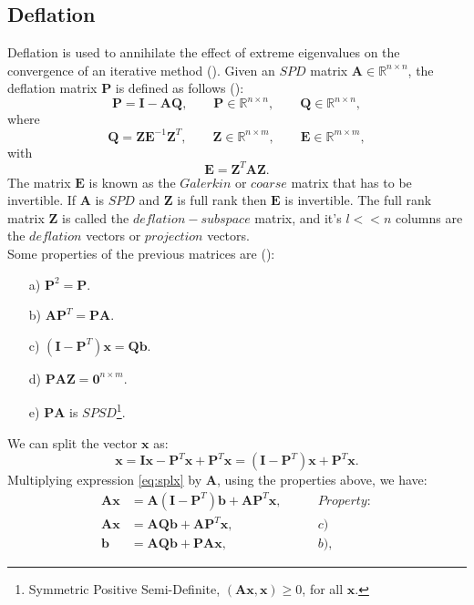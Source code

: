 \documentclass[12pt]{article}
\numberwithin{equation}{section}
\begin{document}
\subsection{Deflation}\label{def}
\hspace{0.5cm}Deflation is used to annihilate the effect of extreme eigenvalues on the convergence of an iterative method (\cite{Vuik99}). 
Given an $SPD$ matrix $\mathbf{A} \in \mathbb{R}^{n \times n}$, the deflation matrix $\mathbf{P}$ is defined as follows (\cite{Tang08,Tang09}):
$$\mathbf{P}=\mathbf{I}-\mathbf{A}\mathbf{Q}, \qquad \mathbf{P} \in \mathbb{R}^{n \times n}, \qquad \mathbf{Q} \in \mathbb{R}^{n \times n},$$
where
$$\mathbf{Q}=\mathbf{Z}\mathbf{E}^{-1}\mathbf{Z}^T, \qquad \mathbf{Z} \in \mathbb{R}^{n \times m}, \qquad \mathbf{E} \in \mathbb{R}^{m \times m}, $$
with
$$\mathbf{E}=\mathbf{Z}^T\mathbf{A}\mathbf{Z}.$$
The matrix $\mathbf{E}$ is known as the $Galerkin$ or $coarse$ matrix that has to be invertible. 
If $\mathbf{A}$ is $SPD$ and $\mathbf{Z}$ is full rank then $\mathbf{E}$ is invertible. 
The full rank matrix $\mathbf{Z}$ is called the $deflation-subspace$ matrix, 
and it's $l<<n$ columns are the
$deflation$ vectors or $projection$ vectors.\\
Some properties of the previous matrices are (\cite{Tang09}):
\begin{enumerate}\label{defprop}
 \item[a)] $\mathbf{P}^2=\mathbf{P}.$
 \item[b)] $\mathbf{A}\mathbf{P}^T=\mathbf{P}\mathbf{A}.$
 \item[c)] $(\mathbf{I}-\mathbf{P}^T)\mathbf{x}=\mathbf{Q}\mathbf{b}.$
 \item[d)] $\mathbf{P}\mathbf{A}\mathbf{Z}=\mathbf{0}^{n\times m}.$
 \item[e)] $\mathbf{P}\mathbf{A}$ is $SPSD$\footnote{Symmetric Positive Semi-Definite, $(\mathbf{A}\mathbf{x},\mathbf{x})\geq 0$, for all $\mathbf{x}$.}.
\end{enumerate}
We can split the vector $\mathbf{x}$ as:
\begin{equation}\label{eq:splx}
    \mathbf{x}=\mathbf{I}\mathbf{x}-\mathbf{P}^T\mathbf{x}+\mathbf{P}^T\mathbf{x}=(\mathbf{I}-\mathbf{P}^T)\mathbf{x}+\mathbf{P}^T\mathbf{x}.
\end{equation}
Multiplying expression \ref{eq:splx} by $\mathbf{A}$, using the properties above, we have:
\begin{align*}
\mathbf{A}\mathbf{x}&=\mathbf{A}(\mathbf{I}-\mathbf{P}^T)\mathbf{b}+\mathbf{A}\mathbf{P}^T\mathbf{x},\qquad&Property:\\
\mathbf{A}\mathbf{x}&=\mathbf{A}\mathbf{Q}\mathbf{b}+\mathbf{A}\mathbf{P}^T\mathbf{x},&c)\\
\mathbf{b}&=\mathbf{A}\mathbf{Q}\mathbf{b}+\mathbf{P}\mathbf{A}\mathbf{x},&b),
\end{align*}
\end{document}

